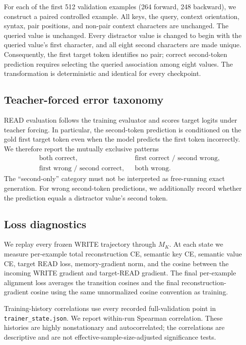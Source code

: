 \documentclass{article}
\begin{document}
For each of the first 512 validation examples (264 forward, 248 backward), we construct a paired controlled example.  All keys, the query, context orientation, syntax, pair positions, and non-pair context characters are unchanged.  The queried value is unchanged.  Every distractor value is changed to begin with the queried value's first character, and all eight second characters are made unique.  Consequently, the first target token identifies no pair; correct second-token prediction requires selecting the queried association among eight values.  The transformation is deterministic and identical for every checkpoint.

\subsection{Teacher-forced error taxonomy}

READ evaluation follows the training evaluator and scores target logits under teacher forcing.  In particular, the second-token prediction is conditioned on the gold first target token even when the model predicts the first token incorrectly.  We therefore report the mutually exclusive patterns
\begin{align*}
  &\text{both correct}, &&\text{first correct / second wrong},\\
  &\text{first wrong / second correct}, &&\text{both wrong}.
\end{align*}
The ``second-only'' category must not be interpreted as free-running exact generation.  For wrong second-token predictions, we additionally record whether the prediction equals a distractor value's second token.

\subsection{Loss diagnostics}

We replay every frozen WRITE trajectory through $M_K$.  At each state we measure per-example total reconstruction CE, semantic key CE, semantic value CE, target READ loss, memory-gradient norm, and the cosine between the incoming WRITE gradient and target-READ gradient.  The final per-example alignment loss averages the transition cosines and the final reconstruction-gradient cosine using the same unnormalized cosine convention as training.

Training-history correlations use every recorded full-validation point in \texttt{trainer\_state.json}.  We report within-run Spearman correlation.  These histories are highly nonstationary and autocorrelated; the correlations are descriptive and are not effective-sample-size-adjusted significance tests.
\end{document}
